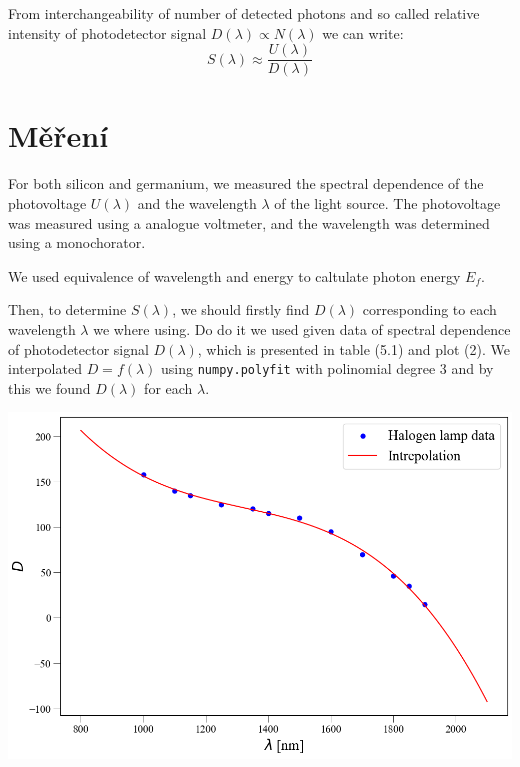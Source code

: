\documentclass[a4paper,11pt]{article}
\begin{document}
\newpage
    \begin{minipage}[t]{0.5\textwidth} 
            From interchangeability of number of detected photons and so called relative intensity of photodetector signal $D(\lambda) \propto N(\lambda)$ we can write:
            \begin{equation}
                S(\lambda) \approx \frac{U(\lambda)}{D(\lambda)}
            \end{equation}
        \section{Měření}     
                For both silicon and germanium, we measured the spectral dependence of the photovoltage $U(\lambda)$ and the wavelength $\lambda$ of the light source. The photovoltage was measured using a analogue voltmeter, and the wavelength was determined using a monochorator. 
                \par We used equivalence of wavelength and energy to caltulate photon energy $E_f$. 
                \par Then, to determine $S(\lambda)$, we should firstly find $D(\lambda)$ corresponding to each wavelength $\lambda$ we where using. Do do it we used given data of spectral dependence of photodetector signal $D(\lambda)$, which is presented in table (5.1) and plot (2). We interpolated $D = f(\lambda)$ using \texttt{numpy.polyfit} with polinomial degree 3 and by this we found $D(\lambda)$ for each $\lambda$.

                \vspace{10pt}   
                \par \centering
                \includegraphics[scale=0.35]{int}
                \captionsetup{justification=centering, font=footnotesize}
                \label{fig:int}
                \vspace{10pt}
                \raggedright 


\end{minipage}
\end{document}

